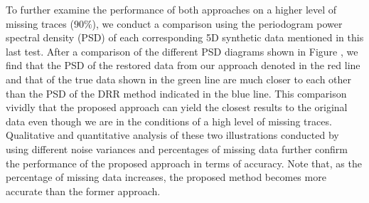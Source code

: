 
To further examine the performance of both approaches on a higher level of missing traces ($90\%$), we conduct a comparison using the periodogram power spectral density (PSD) of each corresponding 5D synthetic data mentioned in this last test. After a comparison of the different PSD diagrams shown in Figure \dlo{\ref{21}}\wen{\ref{Periodogrampsdcomparison9002}}, we find that the PSD of the restored data from our approach denoted in the red line and that of the true data shown in the green line are much closer to each other than the PSD of the DRR method indicated in  the blue line. This comparison vividly  that the proposed approach can yield the closest results to the original data\wen{,} even though we are in the conditions of a high level of missing traces.\\
Qualitative and quantitative analysis of these two illustrations conducted by using different noise variances and percentages of missing data further confirm the performance of the proposed approach in terms of accuracy. Note that, as the percentage of missing data increases, the proposed method becomes more accurate than the former approach.

